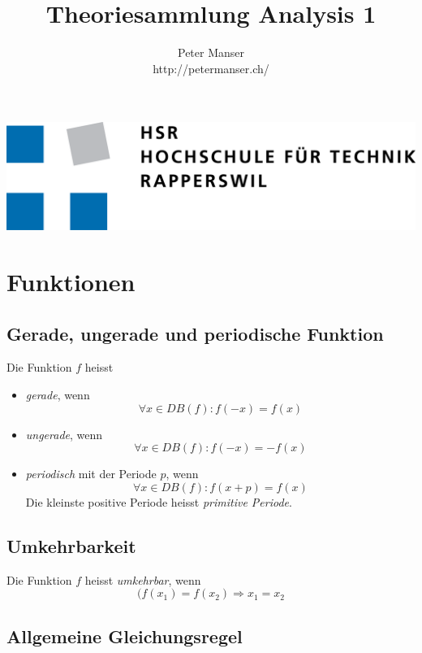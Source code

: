 \documentclass[10pt,a4paper]{article}
\author{Peter Manser\\http://petermanser.ch/}
\title{Theoriesammlung Analysis 1}
\begin{document}
\begin{titlepage}
	\maketitle
	\vspace{120mm}
	\center\includegraphics{hsr_logo.png}
	\thispagestyle{empty} %
\end{titlepage}

\tableofcontents\newpage

\section{Funktionen}

\subsection{Gerade, ungerade und periodische Funktion}

Die Funktion $f$ heisst

\begin{itemize}
\item \textit{gerade}, wenn
$$\forall x \in DB(f): f(-x) = f(x)$$
\item \textit{ungerade}, wenn
$$\forall x \in DB(f): f(-x) = -f(x)$$
\item \textit{periodisch} mit der Periode $p$, wenn
$$\forall x \in DB(f): f(x + p) = f(x)$$
Die kleinste positive Periode heisst \textit{primitive Periode}.
\end{itemize}


\subsection{Umkehrbarkeit}

Die Funktion $f$ heisst \textit{umkehrbar}, wenn
$$(f(x_1) = f(x_2) \Rightarrow x_1 = x_2$$

\subsection{Allgemeine Gleichungsregel}
\end{document}

